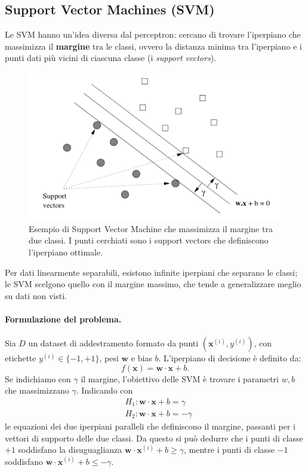 \subsection{Support Vector Machines (SVM)}\label{subsec:svm}
Le SVM hanno un'idea diversa dal perceptron: cercano di trovare l'iperpiano che massimizza il \textbf{margine} tra le classi, ovvero la distanza minima tra l'iperpiano e i punti dati più vicini di ciascuna classe (i \emph{support vectors}).

\begin{figure}[htbp]
  \centering
  \includegraphics[width=.9\textwidth]{images/svm_margin.png}
  \caption{Esempio di Support Vector Machine che massimizza il margine tra due classi. I punti cerchiati sono i support vectors che definiscono l'iperpiano ottimale.}
  \label{fig:svm-margin}
\end{figure}

Per dati linearmente separabili, esistono infinite iperpiani che separano le classi; le SVM scelgono quello con il margine massimo, che tende a generalizzare meglio su dati non visti.

\paragraph{Formulazione del problema.}
Sia $D$ un dataset di addestramento formato da punti \((\mathbf{x}^{(i)},y^{(i)})\), con etichette \(y^{(i)} \in \{-1,+1\}\), pesi \(\mathbf{w}\) e bias \(b\). L'iperpiano di decisione è definito da:
\[
f(\mathbf{x}) = \mathbf{w} \cdot \mathbf{x} + b.
\]
Se indichiamo con $\gamma$ il margine, l'obiettivo delle SVM è trovare i parametri $w, b$ che massimizzano $\gamma$. Indicando con
\begin{align*}
  &H_1: \mathbf{w} \cdot \mathbf{x} + b = \gamma \\
  &H_2: \mathbf{w} \cdot \mathbf{x} + b = -\gamma
\end{align*}
le equazioni dei due iperpiani paralleli che definiscono il margine, passanti per i vettori di supporto delle due classi. Da questo si può dedurre che i punti di classe $+1$ soddisfano la disuguaglianza \(\mathbf{w} \cdot \mathbf{x}^{(i)} + b \geq \gamma\), mentre i punti di classe $-1$ soddisfano \(\mathbf{w} \cdot \mathbf{x}^{(i)} + b \leq -\gamma\). 

